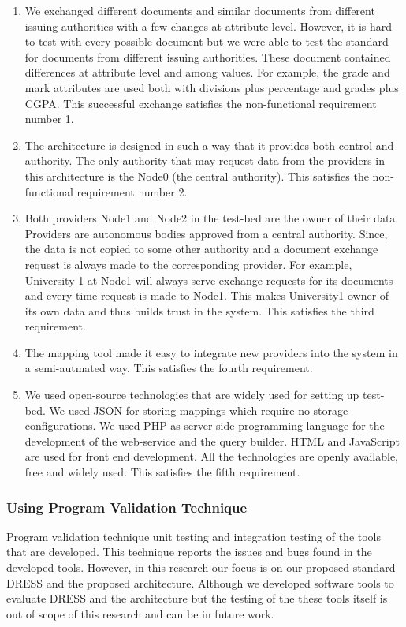 \documentclass[12pt,a4paper,oneside]{book}
\begin{document}
	\begin{enumerate}  

		\item We exchanged different documents and similar documents from different issuing authorities with a few changes at attribute level. However, it is hard to test with every possible document but we were able to test the standard for documents from different issuing authorities. These document contained differences at attribute level and among values. For example, the grade and mark attributes are used both with divisions plus percentage and grades plus CGPA. This successful exchange satisfies the non-functional requirement number 1.

		\item The architecture is designed in such a way that it provides both control and authority. The only authority that may request data from the providers in this architecture is the Node0 (the central authority). This satisfies the non-functional requirement number 2. 
	
		\item Both providers Node1 and Node2 in the test-bed are the owner of their data. Providers are autonomous bodies approved from a central authority. Since, the data is not copied to some other authority and a document exchange request is always made to the corresponding provider. For example, University 1 at Node1 will always serve exchange requests for its documents and every time request is made to Node1. This makes University1 owner of its own data and thus builds trust in the system. This satisfies the third requirement.
		
		\item The mapping tool made it easy to integrate new providers into the system in a semi-autmated way. This satisfies the fourth requirement. 
		
		\item We used open-source technologies that are widely used for setting up test-bed. We used JSON for storing mappings which require no storage configurations. We used PHP as server-side programming language for the development of the web-service and the query builder. HTML and JavaScript are used for front end development. All the technologies are openly available, free and widely used. This satisfies the fifth requirement.

	\end{enumerate}
		
		
		\subsubsection{Using Program Validation Technique}
		Program validation technique unit testing and integration testing of the tools that are developed. This technique reports the issues and bugs found in the developed tools. However, in this research our focus is on our proposed standard DRESS and the proposed architecture. Although we developed software tools to evaluate DRESS and the architecture but the testing of the these tools itself is out of scope of this research and can be in future work. \\
	
\end{document}
